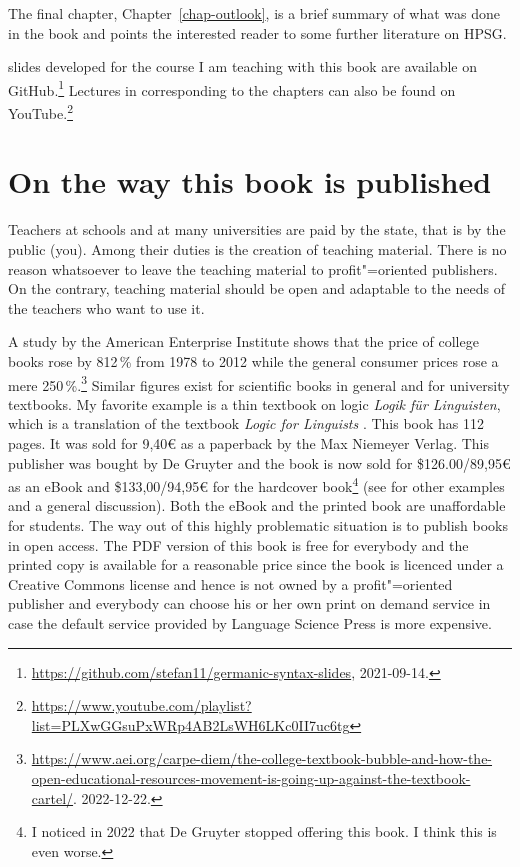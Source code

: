 
The final chapter, Chapter~\ref{chap-outlook}, is a brief summary of what was done in the book and
points the interested reader to some further literature on HPSG.

 slides developed for the course I am teaching with this book are available on GitHub.\footnote{
\url{https://github.com/stefan11/germanic-syntax-slides}, 2021-09-14.
}
Lectures in  corresponding to the chapters can also be found on YouTube.\footnote{
\url{https://www.youtube.com/playlist?list=PLXwGGsuPxWRp4AB2LsWH6LKc0II7uc6tg}
}

\section*{On the way this book is published}

Teachers at schools and at many universities are paid by the state, that is by the public (you). Among
their duties is the creation of teaching material. There is no reason whatsoever to leave the
teaching material to profit"=oriented publishers. On the contrary, teaching material should be open
and adaptable to the needs of the teachers who want to use it. 

A study by the American Enterprise Institute shows that the price of college books rose by 812\,\%
from 1978 to 2012 while the general consumer prices rose a mere 250\,\%.\footnote{
\url{https://www.aei.org/carpe-diem/the-college-textbook-bubble-and-how-the-open-educational-resources-movement-is-going-up-against-the-textbook-cartel/}.
2022-12-22.%
} Similar figures exist for scientific books in general and for university textbooks. My favorite example is a thin textbook
on logic \emph{Logik für Linguisten}, which is a translation of the  textbook \emph{Logic for
Linguists} \citep{AAD73a}. This book has 112 pages. It was sold for 9,40€ as a paperback by the Max Niemeyer
Verlag. This publisher was bought by De Gruyter and the book is now sold for \$126.00/89,95€ as an
eBook and \$133,00/94,95€ for the hardcover book\footnote{
I noticed in 2022 that De Gruyter stopped offering this book. I think this is even worse.
} (see \citealp{MuellerOA} for other examples and a general discussion). Both the eBook and the printed book are unaffordable for students. The way out of this highly
problematic situation is to publish books in open access. The PDF version of this book is free for
everybody and the printed copy is available for a reasonable price since the book is licenced under
a Creative Commons license and hence is not owned by a
profit"=oriented publisher and everybody can choose his or her own print on demand service in case
the default service provided by Language Science Press is more expensive.

